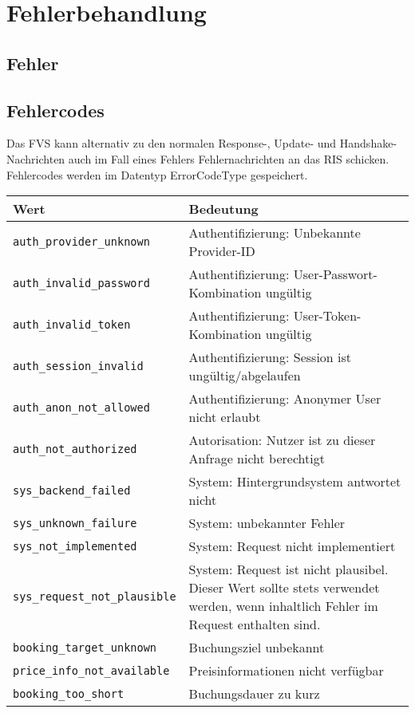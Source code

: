\section{Fehlerbehandlung}
\subsection*{Fehler}


\subsection*{Fehlercodes}
Das FVS kann alternativ zu den normalen Response-, Update- und Handshake-Nachrichten auch im Fall eines Fehlers Fehlernachrichten an das RIS schicken. Fehlercodes werden im Datentyp ErrorCodeType gespeichert.
\begin{flushleft}
\begin{tabularx}{\linewidth}{l>{\raggedright\arraybackslash}X} 
\toprule
Wert & Bedeutung\\
\midrule
\verb|auth_provider_unknown| & Authentifizierung: Unbekannte Provider-ID\\
\verb|auth_invalid_password| & Authentifizierung: User-Passwort-Kombination ungültig\\
\verb|auth_invalid_token| & Authentifizierung: User-Token-Kombination ungültig\\
\verb|auth_session_invalid| & Authentifizierung: Session ist ungültig/abgelaufen\\
\verb|auth_anon_not_allowed| & Authentifizierung: Anonymer User nicht erlaubt\\
\verb|auth_not_authorized| & Autorisation: Nutzer ist zu dieser Anfrage nicht berechtigt\\
\verb|sys_backend_failed| & System: Hintergrundsystem antwortet nicht\\
\verb|sys_unknown_failure| & System: unbekannter Fehler\\
\verb|sys_not_implemented| & System: Request nicht implementiert\\
\verb|sys_request_not_plausible| & System: Request ist nicht plausibel. Dieser Wert sollte stets verwendet werden, wenn inhaltlich Fehler im Request enthalten sind.\\
\verb|booking_target_unknown| & Buchungsziel unbekannt\\
\verb|price_info_not_available| & Preisinformationen nicht verfügbar\\
\verb|booking_too_short| & Buchungsdauer zu kurz\\

\end{tabularx}
\end{flushleft}
